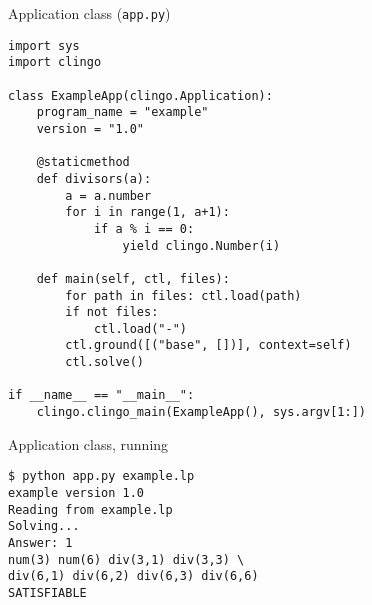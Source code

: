 \begin{frame}{Application class (\texttt{app.py})}
\begin{lstlisting}
import sys
import clingo

class ExampleApp(clingo.Application):
    program_name = "example"
    version = "1.0"

    @staticmethod
    def divisors(a):
        a = a.number
        for i in range(1, a+1):
            if a % i == 0:
                yield clingo.Number(i)

    def main(self, ctl, files):
        for path in files: ctl.load(path)
        if not files:
            ctl.load("-")
        ctl.ground([("base", [])], context=self)
        ctl.solve()

if __name__ == "__main__":
    clingo.clingo_main(ExampleApp(), sys.argv[1:])
\end{lstlisting}
\end{frame}
\begin{frame}[fragile]{Application class, running}
  \bigskip
\begin{lstlisting}
$ python app.py example.lp
example version 1.0
Reading from example.lp
Solving...
Answer: 1
num(3) num(6) div(3,1) div(3,3) \
div(6,1) div(6,2) div(6,3) div(6,6)
SATISFIABLE
\end{lstlisting}
\end{frame}
%
